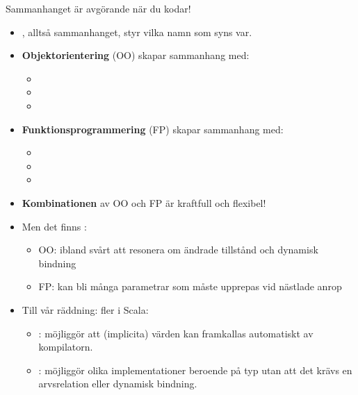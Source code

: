 \begin{Slide}{Sammanhanget är avgörande när du kodar!}
\begin{itemize}\SlideFontSmall
  \item {}, alltså sammanhanget, styr vilka namn som syns var.
  \pause
  \item \textbf{Objektorientering} (OO) skapar sammanhang med:
  \begin{itemize}\SlideFontTiny
    \item {}
    \item {}
    \item {}
  \end{itemize} 
  \pause
  \item \textbf{Funktionsprogrammering} (FP) skapar sammanhang med:
  \begin{itemize}\SlideFontTiny
    \item {}
    \item {}
    \item {}
  \end{itemize}
  \pause
  \item \textbf{Kombinationen} av OO och FP är  kraftfull och flexibel!
  \pause
  \item Men det finns :
  \begin{itemize}\SlideFontTiny
    \item OO: ibland svårt att resonera om ändrade tillstånd och dynamisk bindning
    \item FP: kan bli många parametrar som måste upprepas vid nästlade anrop
  \end{itemize} 
  \pause
  \item Till vår räddning: fler  i Scala: 
  \begin{itemize}\SlideFontTiny
    \item {}: möjliggör att  (implicita) värden kan framkallas automatiskt av kompilatorn.
    \item {}: möjliggör olika implementationer beroende på  typ utan att det krävs en arvsrelation eller dynamisk bindning.
  \end{itemize} 
\end{itemize}
\end{Slide}


